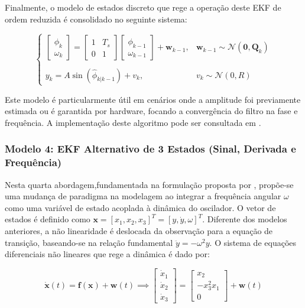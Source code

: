 \documentclass[a4paper,12pt]{article}
\begin{document}
Finalmente, o modelo de estados discreto que rege a operação deste EKF de ordem reduzida é consolidado no seguinte sistema:

\begin{equation}
    \begin{cases}
        \begin{bmatrix} \phi_{k} \\ \omega_{k} \end{bmatrix} = \begin{bmatrix} 1 & T_s \\ 0 & 1 \end{bmatrix} \begin{bmatrix} \phi_{k-1} \\ \omega_{k-1} \end{bmatrix} + \mathbf{w}_{k-1}, & \mathbf{w}_{k-1} \sim \mathcal{N}(\mathbf{0}, \mathbf{Q}_k) \\ \\
        y_k = A \sin(\hat{\phi}_{k|k-1}) + v_k, & v_k \sim \mathcal{N}(0, R)
    \end{cases}
    \label{eq:mod3_sistema_discreto_completo}
\end{equation}

Este modelo é particularmente útil em cenários onde a amplitude foi previamente estimada ou é garantida por hardware, focando a convergência do filtro na fase e frequência. A implementação deste algoritmo pode ser consultada em .


\subsubsection{Modelo 4: EKF Alternativo de 3 Estados (Sinal, Derivada e Frequência)}
\label{subsubsec:modelo4}

Nesta quarta abordagem,fundamentada na formulação proposta por ,  propõe-se uma mudança de paradigma na modelagem ao integrar a frequência angular $\omega$ como uma variável de estado acoplada à dinâmica do oscilador. O vetor de estados é definido como $\mathbf{x} = [x_1, x_2, x_3]^T = [y, \dot{y}, \omega]^T$. Diferente dos modelos anteriores, a não linearidade é deslocada da observação para a equação de transição, baseando-se na relação fundamental $\ddot{y} = -\omega^2 y$. O sistema de equações diferenciais não lineares que rege a dinâmica é dado por:

\begin{equation}
    \dot{\mathbf{x}}(t) = \mathbf{f}(\mathbf{x}) + \mathbf{w}(t) \implies \begin{bmatrix} \dot{x}_1 \\ \dot{x}_2 \\ \dot{x}_3 \end{bmatrix} = \begin{bmatrix} x_2 \\ -x_3^2 x_1 \\ 0 \end{bmatrix} + \mathbf{w}(t)
    \label{eq:mod4_cont_dinamica}
\end{equation}
\end{document}
